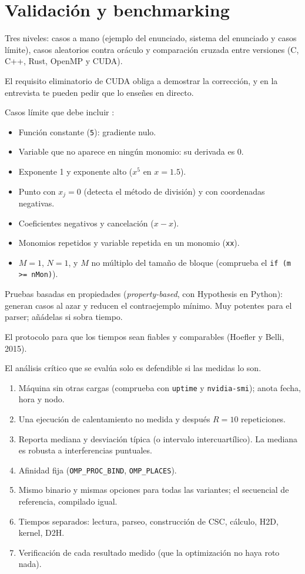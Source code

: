\section{Validación y benchmarking}\label{tema:val}

\que Tres niveles: casos a mano (ejemplo del enunciado, sistema del enunciado y casos límite), casos aleatorios contra oráculo y comparación cruzada entre versiones (C, C++, Rust, OpenMP y CUDA).

\porque El requisito eliminatorio de CUDA obliga a demostrar la corrección, y en la entrevista te pueden pedir que lo enseñes en directo.

\como Casos límite que debe incluir :
\begin{itemize}
\item Función constante (\texttt{5}): gradiente nulo.
\item Variable que no aparece en ningún monomio: su derivada es 0.
\item Exponente 1 y exponente alto ($x^5$ en $x=1.5$).
\item Punto con $x_j=0$ (detecta el método de división) y con coordenadas negativas.
\item Coeficientes negativos y cancelación ($x-x$).
\item Monomios repetidos y variable repetida en un monomio (\texttt{xx}).
\item $M=1$, $N=1$, y $M$ no múltiplo del tamaño de bloque (comprueba el \texttt{if (m >= nMon)}).
\end{itemize}

\alt Pruebas basadas en propiedades (\emph{property-based}, con Hypothesis en Python): generan casos al azar y reducen el contraejemplo mínimo. Muy potentes para el parser; añádelas si sobra tiempo.

\que El protocolo para que los tiempos sean fiables y comparables (Hoefler y Belli, 2015).

\porque El análisis crítico que se evalúa solo es defendible si las medidas lo son.

\como
\begin{enumerate}
\item Máquina sin otras cargas (comprueba con \texttt{uptime} y \texttt{nvidia-smi}); anota fecha, hora y nodo.
\item Una ejecución de calentamiento no medida y después $R=10$ repeticiones.
\item Reporta mediana y desviación típica (o intervalo intercuartílico). La mediana es robusta a interferencias puntuales.
\item Afinidad fija (\texttt{OMP\_PROC\_BIND}, \texttt{OMP\_PLACES}).
\item Mismo binario y mismas opciones para todas las variantes; el secuencial de referencia, compilado igual.
\item Tiempos separados: lectura, parseo, construcción de CSC, cálculo, H2D, kernel, D2H.
\item Verificación de cada resultado medido (que la optimización no haya roto nada).
\end{enumerate}

